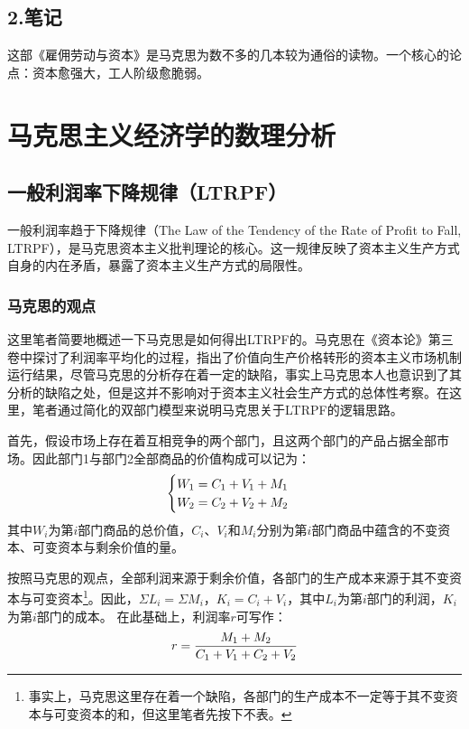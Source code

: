 \documentclass[a4paper,twoside,12pt,AutoFakeBold]{ctexart}
\begin{document}
\newpage

\subsection{2.笔记}

这部《雇佣劳动与资本》是马克思为数不多的几本较为通俗的读物。一个核心的论点：资本愈强大，工人阶级愈脆弱。

\newpage
\section{马克思主义经济学的数理分析}

\subsection{一般利润率下降规律（LTRPF）}
一般利润率趋于下降规律（The Law of the Tendency of the Rate of Profit to Fall, LTRPF），是马克思资本主义批判理论的核心。这一规律反映了资本主义生产方式自身的内在矛盾，暴露了资本主义生产方式的局限性。
\subsubsection{马克思的观点}
这里笔者简要地概述一下马克思是如何得出LTRPF的。马克思在《资本论》第三卷中探讨了利润率平均化的过程，指出了价值向生产价格转形的资本主义市场机制运行结果，尽管马克思的分析存在着一定的缺陷，事实上马克思本人也意识到了其分析的缺陷之处，但是这并不影响对于资本主义社会生产方式的总体性考察。在这里，笔者通过简化的双部门模型来说明马克思关于LTRPF的逻辑思路。

首先，假设市场上存在着互相竞争的两个部门，且这两个部门的产品占据全部市场。因此部门1与部门2全部商品的价值构成可以记为：
\begin{equation}
    \begin{cases}
        W_1=C_1+V_1+M_1\\
        W_2=C_2+V_2+M_2
    \end{cases}\notag
\end{equation}
其中$W_i$为第$i$部门商品的总价值，$C_i$、$V_i$和$M_i$分别为第$i$部门商品中蕴含的不变资本、可变资本与剩余价值的量。

按照马克思的观点，全部利润来源于剩余价值，各部门的生产成本来源于其不变资本与可变资本\footnote{事实上，马克思这里存在着一个缺陷，各部门的生产成本不一定等于其不变资本与可变资本的和，但这里笔者先按下不表。}。因此，$\Sigma L_i=\Sigma M_i$，$ K_i =  C_i+V_i$，其中$L_i$为第$i$部门的利润，$K_i$为第$i$部门的成本。
在此基础上，利润率$r$可写作：
\begin{equation}
    r=\frac{M_1+M_2}{C_1+V_1+C_2+V_2}\notag
\end{equation}
\end{document}
